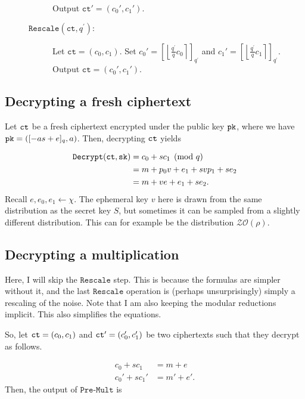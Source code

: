 \documentclass[a4paper,10pt]{article}
\begin{document}
\begin{figure}[h]
\begin{description}
		Output
		\(  \texttt{ct}' =(c_0',c_1')\).
		
		\item[$\texttt{Rescale}(\texttt{ct},q^\prime):$] Let $\texttt{ct} = (c_0,c_1)$. Set 
		$c_0'=  \left[  \left\lfloor \frac{q^\prime}{q}c_0 \right\rceil \right]_{q^\prime}$ and 
		$c_1' =  \left[  \left\lfloor \frac{q^\prime}{q}c_1 \right\rceil \right]_{q^\prime}$.
		Output $\texttt{ct} = (c_0',c_1')$.
	\end{description}
\end{figure}

\subsection{Decrypting a fresh ciphertext}

Let $\texttt{ct}$ be a fresh ciphertext encrypted under the public key $\texttt{pk}$, where we have
$\texttt{pk} = \left([-as + e]_{q} , a\right)$. Then, decrypting $\texttt{ct}$ yields

\begin{align*}
	\texttt{Decrypt}(\texttt{ct}, \texttt{sk}) & = c_0 + sc_1 \pmod{q} \\
                   & = m + p_0v + e_1 + svp_1 + se_2 \\
                   & = m + ve + e_1 + se_2.
\end{align*}
Recall $e, e_0, e_1 \leftarrow \chi$. 
The ephemeral key $v$ here is drawn from the same distribution as 
the secret key $S$, but sometimes it can be sampled from a slightly different
distribution. This can for example be the distribution $\mathcal{ZO}(\rho)$.

\subsection{Decrypting a multiplication}
Here, I will skip the $\texttt{Rescale}$ step. This is because the formulas are simpler without 
it, and the last $\texttt{Rescale}$ operation is (perhaps unsurprisingly) simply a rescaling of the
noise. Note that I am also keeping the modular reductions implicit. This also simplifies the equations. 

So, let $\texttt{ct} = (c_0, c_1)$ and $\texttt{ct}' = (c_0', c_1')$ be two ciphertexts such that they decrypt
as follows.

\begin{align*}
	c_0 + sc_1 & = m + e \\
	c_0' + sc_1' &= m' + e'.
\end{align*}
Then, the output of $\texttt{Pre-Mult}$ is 
\end{document}
